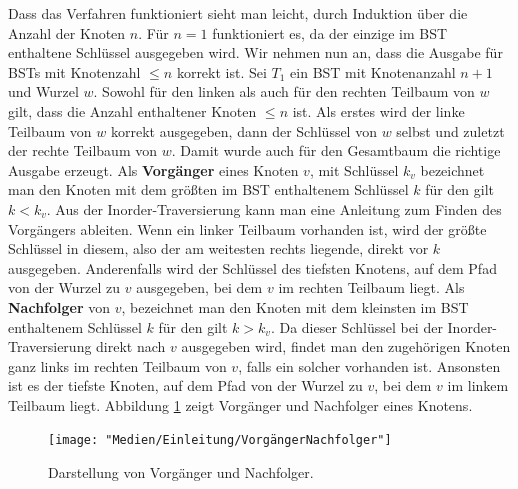 \documentclass[a4paper,12pt]{article}
\begin{document}
\noindent Dass das Verfahren funktioniert sieht man leicht, durch Induktion über die Anzahl der Knoten $n$.
Für $n = 1$ funktioniert es, da der einzige im BST enthaltene Schlüssel ausgegeben wird. Wir nehmen nun an, dass die Ausgabe für BSTs mit Knotenzahl $\leq n$ korrekt ist. Sei $T_1$ ein BST mit Knotenanzahl $n + 1$ und Wurzel $w$. Sowohl für den linken als auch für den rechten Teilbaum von $w$ gilt, dass die Anzahl enthaltener Knoten $\leq n$ ist. Als erstes wird der linke Teilbaum von $w$ korrekt ausgegeben, dann der Schlüssel von $w$ selbst und zuletzt der rechte Teilbaum von $w$. Damit wurde auch für den Gesamtbaum die richtige
Ausgabe erzeugt. 
Als \textbf{Vorgänger} eines Knoten $v$, mit Schlüssel $k_v$ bezeichnet man den Knoten mit dem größten im BST enthaltenem Schlüssel $k$ für den gilt $k < k_v$. Aus der Inorder-Traversierung kann man eine Anleitung zum Finden des Vorgängers ableiten. Wenn ein linker Teilbaum vorhanden ist, wird der größte Schlüssel in diesem, also der am weitesten rechts liegende, direkt vor $k$ ausgegeben. Anderenfalls wird der Schlüssel des tiefsten Knotens, auf dem Pfad von der Wurzel zu $v$ ausgegeben, bei dem $v$ im rechten Teilbaum liegt. Als \textbf{Nachfolger} von $v$, bezeichnet man den Knoten mit dem kleinsten im BST enthaltenem Schlüssel $k$ für den gilt $k > k_v$.
Da dieser Schlüssel bei der Inorder-Traversierung direkt nach $v$ ausgegeben wird, findet man den zugehörigen Knoten ganz links im rechten Teilbaum von $v$, falls ein solcher vorhanden ist. Ansonsten ist es der tiefste Knoten, auf dem Pfad von der Wurzel zu $v$, bei dem $v$ im linkem Teilbaum liegt. Abbildung \ref{fig:VorgängerNachfolger} zeigt Vorgänger und Nachfolger eines Knotens.

\begin{figure}[h]
	\centering
	\texttt{[image: "Medien/Einleitung/VorgängerNachfolger"]}
	\caption{Darstellung von Vorgänger und Nachfolger. }
	\label{fig:VorgängerNachfolger}
\end{figure}
\end{document}

